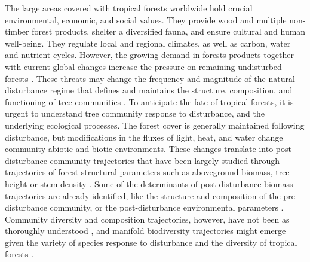 \documentclass[fleqn,10pt]{ArtEcoFoG} %
\begin{document}
The large areas covered with tropical forests worldwide hold crucial
environmental, economic, and social values. They provide wood and
multiple non-timber forest products, shelter a diversified fauna, and
ensure cultural and human well-being. They regulate local and regional
climates, as well as carbon, water and nutrient cycles. However, the
growing demand in forests products together with current global changes
increase the pressure on remaining undisturbed forests
\citep{Morales-Hidalgo2015}. \color{red}These threats may change the
frequency and magnitude of the natural disturbance regime that defines
and maintains the structure, composition, and functioning of tree
communities \citep{Schnitzer2001, Anderson-Teixeira2013, Sist2015}.
\color{black} To anticipate the fate of tropical forests, it is urgent
to understand tree community response to disturbance, and the underlying
ecological processes. The forest cover is generally maintained following
disturbance, but modifications in the fluxes of light, heat, and water
\citep{Goulamoussene2017} change community abiotic and biotic
environments. These changes translate into post-disturbance community
trajectories that have been largely studied through trajectories of
forest structural parameters such as aboveground biomass, tree height or
stem density \citep{Piponiot2016, Rutishauser2016}. Some of the
determinants of post-disturbance biomass trajectories are already
identified, like the structure and composition of the pre-disturbance
community, or the post-disturbance environmental parameters
\citep{Herault2018}. Community diversity and composition trajectories,
however, have not been as thoroughly understood
\citep{Guitet2018, Molino2001}, and manifold biodiversity trajectories
might emerge given the variety of species response to disturbance and
the diversity of tropical forests
\citep{Lindenmayer2012, Garcia_florez2017}.
\end{document}
